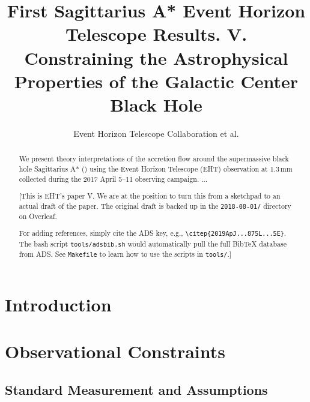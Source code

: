 \documentclass[twocolumn,twocolappendix,tighten,dvipsnames,linenumbers]{aastex63}
\begin{document}
\title{First Sagittarius A* Event Horizon Telescope Results. V.\\
  Constraining the Astrophysical Properties of the Galactic Center Black Hole}

\author{Event Horizon Telescope Collaboration et al.}


\received{\today}
\revised{\today}

\begin{abstract}
  We present theory interpretations of the accretion flow around the
  supermassive black hole Sagittarius A* (\sgra) using the Event
  Horizon Telescope (EHT) observation at 1.3\,mm collected during the 2017 April
  5--11 observing campaign.
  ...

  \color{BrickRed}

  [This is EHT's \sgra paper V.
  We are at the position to turn this from a sketchpad to an actual
  draft of the paper.
  The original draft is backed up in the \texttt{2018-08-01/}
  directory on Overleaf.

  For adding references, simply cite the ADS key, e.g.,
  \texttt{\textbackslash citep\{2019ApJ...875L...5E\}}.
  The bash script \texttt{tools/adsbib.sh} would automatically pull
  the full BibTeX database from ADS.
  See \texttt{Makefile} to learn how to use the scripts in
  \texttt{tools/}.]
\end{abstract}


\tableofcontents

\section{Introduction}

\section{Observational Constraints}

\subsection{Standard Measurement and Assumptions}
\end{document}
